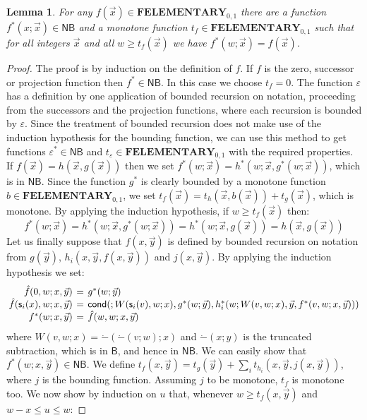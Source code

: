 \documentclass[manuscript,screen]{acmart}
\newtheorem{lem}[thm]{Lemma}
\theoremstyle{definition}
\theoremstyle{remark}
\newcommand{\elementary}{\mathbf{ELEMENTARY}}
\newcommand{\f}{\mathbf{F}}
\newcommand{\felementary}{\f\elementary}
\renewcommand{\succ}[1]{\mathsf{s}_{#1}}
\newcommand{\cnd}{\mathsf{cond}}
\newcommand{\bc}{\mathsf{B}}
\newcommand{\nested}{\mathsf{N}}
\newcommand{\nbc}{\nested\bc}
\begin{document}
\begin{lem}\label{lem:padding}
For any $f(\vec{x}) \in \felementary_{0,1}$  there are a function $f^*(x; \vec{x})\in \nbc$ and a monotone function $t_f\in \felementary_{0,1}$ such that for all integers $\vec{x}$ and all $w \geq t_f(\vec{x})$ we have $f^*(w; \vec{x})=f(\vec{x})$.
\end{lem}
\begin{proof}
The proof is by induction on the definition of $f$.  If $f$ is the zero, successor or projection  function then $f^*\in \nbc$.  In this case we choose $t_f=0$. The function $\varepsilon$ has a definition by one application of bounded recursion on notation, proceeding from the successors and the projection functions, where each recursion is bounded by $\varepsilon$. Since the treatment of bounded recursion  does not make use of the induction hypothesis for the bounding function, we can use this method to get functions $\varepsilon^*\in \nbc$ and $t_{\varepsilon}\in \felementary_{0,1}$ with the required properties.  If $f(\vec x)= h(\vec x, g(\vec{x}))$ then we set  $f^*(w;\vec{x})=h^*(w; \vec x, g^*(w;\vec{x}))$, which is in $\nbc$.  Since the function $g^*$ is clearly bounded by a monotone function $b \in \felementary_{0,1}$, we set $ t_f(\vec{x})= t_h(\vec x, b(\vec{x}))+  t_{g}(\vec{x})$,  which is monotone. By applying the induction hypothesis,  if   $w \geq t_f(\vec{x})$ then:
\begin{equation*}
         f^*(w; \vec{x})=  h^*(w; \vec{x}, g^*(w; \vec{x})) 
         =h^*(w;\vec x, g(\vec{x})) 
         = h(\vec x, g(\vec{x}))
\end{equation*}
Let us finally suppose that $f(x, \vec{y})$ is defined by bounded recursion on notation from $g(\vec y)$, $h_i(x, \vec y, f(x, \vec y))$ and $j(x, \vec y)$. By applying the induction hypothesis we set:
\begin{equation*}
\arraycolsep=2pt
    \begin{array}{rcl}
     \hat{f}(0,w; x, \vec{y})&=& g^*(w; \vec{y})\\
      \hat{f}(\succ i(x),w; x, \vec{y})&=& \cnd(; W(\succ i(v),w;x), g^*(w; \vec{y}),  h^*_i(w; W(v,w;x), \vec{y}, f^*(v,w;x,\vec{y})) )\\
     f^*(w;x, \vec{y})&= & \hat{f}(w,w; x, \vec{y}) 
    \end{array}
\end{equation*}
where $ W(v,w;x)=\dot-( \dot-(v;w) ; x)$ and $\dot-(x;y)$ is the truncated subtraction, which is in $\bc$, and hence in  $\nbc$. We can easily show that $f^*(w;x, \vec y)\in \nbc$. We define $t_f(x, \vec{y})=t_{g}(\vec{y})+\sum_i t_{h_i}(x, \vec{y}, j(x, \vec{y}))$, where $j$ is the bounding function. Assuming $j$ to be monotone, $t_f$ is monotone too.  We now show by induction on $u$ that, whenever $w \geq t_f(x,\vec{y})$ and $w-x\leq u \leq w$:

\end{proof}
\end{document}
